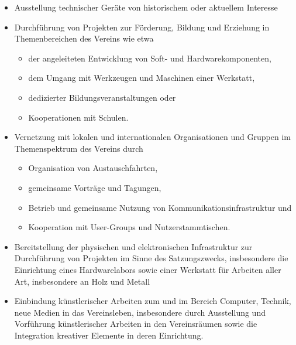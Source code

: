 \documentclass[fontsize=12pt,paper=a4,pagesize,headings=small]{scrartcl}
\begin{document}
\begin{enumerate}
\begin{itemize}
		\item Ausstellung technischer Geräte von historischem oder aktuellem
			Interesse

		\item Durchführung von Projekten zur Förderung, Bildung und Erziehung
			in Themenbereichen des Vereins wie etwa
			\begin{itemize}
				\item der angeleiteten Entwicklung von Soft- und Hardwarekomponenten,
				\item dem Umgang mit Werkzeugen und Maschinen einer Werkstatt,	
				\item dedizierter Bildungsveranstaltungen oder
				\item Kooperationen mit Schulen.
		\end{itemize}

		\item Vernetzung mit lokalen und internationalen Organisationen und
			Gruppen im Themenspektrum des Vereins durch
			\begin{itemize}
				\item Organisation von Austauschfahrten,
				\item gemeinsame Vorträge und Tagungen,
				\item Betrieb und gemeinsame Nutzung von
					Kommunikationsinfrastruktur und
				\item Kooperation mit User-Groups und Nutzerstammtischen.
			\end{itemize}

		\item Bereitstellung der physischen und elektronischen Infrastruktur zur
			Durchführung von Projekten im Sinne des Satzungszwecks,
			insbesondere die Einrichtung eines Hardwarelabors sowie einer 
			Werkstatt für Arbeiten aller Art, insbesondere an Holz und Metall

		\item Einbindung künstlerischer Arbeiten zum und im Bereich Computer,
			Technik, neue Medien in das Vereinsleben, insbesondere durch
			Ausstellung und Vorführung künstlerischer Arbeiten in den
			Vereinsräumen sowie die Integration kreativer Elemente in
			deren Einrichtung.
	\end{itemize}
\end{enumerate}
\end{document}
